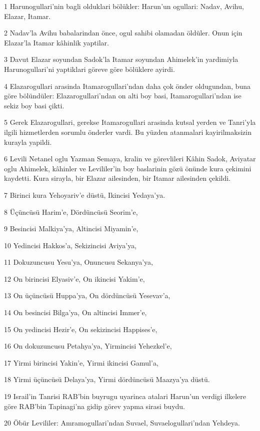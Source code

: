 \par 1 Harunogullari'nin bagli olduklari bölükler: Harun'un ogullari: Nadav, Avihu, Elazar, Itamar.
\par 2 Nadav'la Avihu babalarindan önce, ogul sahibi olamadan öldüler. Onun için Elazar'la Itamar kâhinlik yaptilar.
\par 3 Davut Elazar soyundan Sadok'la Itamar soyundan Ahimelek'in yardimiyla Harunogullari'ni yaptiklari göreve göre bölüklere ayirdi.
\par 4 Elazarogullari arasinda Itamarogullari'ndan daha çok önder oldugundan, buna göre bölündüler: Elazarogullari'ndan on alti boy basi, Itamarogullari'ndan ise sekiz boy basi çikti.
\par 5 Gerek Elazarogullari, gerekse Itamarogullari arasinda kutsal yerden ve Tanri'yla ilgili hizmetlerden sorumlu önderler vardi. Bu yüzden atanmalari kayirilmaksizin kurayla yapildi.
\par 6 Levili Netanel oglu Yazman Semaya, kralin ve görevlileri Kâhin Sadok, Aviyatar oglu Ahimelek, kâhinler ve Levililer'in boy baslarinin gözü önünde kura çekimini kaydetti. Kura sirayla, bir Elazar ailesinden, bir Itamar ailesinden çekildi.
\par 7 Birinci kura Yehoyariv'e düstü, Ikincisi Yedaya'ya.
\par 8 Üçüncüsü Harim'e, Dördüncüsü Seorim'e,
\par 9 Besincisi Malkiya'ya, Altincisi Miyamin'e,
\par 10 Yedincisi Hakkos'a, Sekizincisi Aviya'ya,
\par 11 Dokuzuncusu Yesu'ya, Onuncusu Sekanya'ya,
\par 12 On birincisi Elyasiv'e, On ikincisi Yakim'e,
\par 13 On üçüncüsü Huppa'ya, On dördüncüsü Yesevav'a,
\par 14 On besincisi Bilga'ya, On altincisi Immer'e,
\par 15 On yedincisi Hezir'e, On sekizincisi Happises'e,
\par 16 On dokuzuncusu Petahya'ya, Yirmincisi Yehezkel'e,
\par 17 Yirmi birincisi Yakin'e, Yirmi ikincisi Gamul'a,
\par 18 Yirmi üçüncüsü Delaya'ya, Yirmi dördüncüsü Maazya'ya düstü.
\par 19 Israil'in Tanrisi RAB'bin buyrugu uyarinca atalari Harun'un verdigi ilkelere göre RAB'bin Tapinagi'na gidip görev yapma sirasi buydu.
\par 20 Öbür Levililer: Amramogullari'ndan Suvael, Suvaelogullari'ndan Yehdeya.
